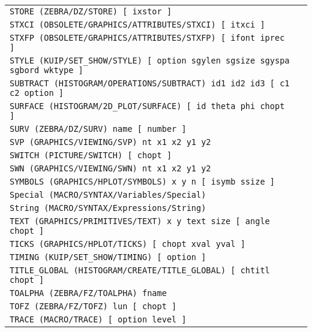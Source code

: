\begin{longtable}{|>{\footnotesize\tt}lr|}
STORE (ZEBRA/DZ/STORE)  [ ixstor ] & \pageref{ref:ZEBRA/DZ/STORE}\\ 
STXCI (OBSOLETE/GRAPHICS/ATTRIBUTES/STXCI)  [ itxci ] & \pageref{ref:OBSOLETE/GRAPHICS/ATTRIBUTES/STXCI}\\ 
STXFP (OBSOLETE/GRAPHICS/ATTRIBUTES/STXFP)  [ ifont iprec ] & \pageref{ref:OBSOLETE/GRAPHICS/ATTRIBUTES/STXFP}\\ 
STYLE (KUIP/SET_SHOW/STYLE)  [ option sgylen sgsize sgyspa sgbord wktype ] & \pageref{ref:KUIP/SET_SHOW/STYLE}\\ 
SUBTRACT (HISTOGRAM/OPERATIONS/SUBTRACT)  id1 id2 id3 [ c1 c2 option ] & \pageref{ref:HISTOGRAM/OPERATIONS/SUBTRACT}\\ 
SURFACE (HISTOGRAM/2D_PLOT/SURFACE)  [ id theta phi chopt ] & \pageref{ref:HISTOGRAM/2D_PLOT/SURFACE}\\ 
SURV (ZEBRA/DZ/SURV)  name [ number ] & \pageref{ref:ZEBRA/DZ/SURV}\\ 
SVP (GRAPHICS/VIEWING/SVP)  nt x1 x2 y1 y2 & \pageref{ref:GRAPHICS/VIEWING/SVP}\\ 
SWITCH (PICTURE/SWITCH)  [ chopt ] & \pageref{ref:PICTURE/SWITCH}\\ 
SWN (GRAPHICS/VIEWING/SWN)  nt x1 x2 y1 y2 & \pageref{ref:GRAPHICS/VIEWING/SWN}\\ 
SYMBOLS (GRAPHICS/HPLOT/SYMBOLS)  x y n [ isymb ssize ] & \pageref{ref:GRAPHICS/HPLOT/SYMBOLS}\\ 
Special (MACRO/SYNTAX/Variables/Special)  & \pageref{ref:MACRO/SYNTAX/Variables/Special}\\ 
String (MACRO/SYNTAX/Expressions/String)  & \pageref{ref:MACRO/SYNTAX/Expressions/String}\\ 
TEXT (GRAPHICS/PRIMITIVES/TEXT)  x y text size [ angle chopt ] & \pageref{ref:GRAPHICS/PRIMITIVES/TEXT}\\ 
TICKS (GRAPHICS/HPLOT/TICKS)  [ chopt xval yval ] & \pageref{ref:GRAPHICS/HPLOT/TICKS}\\ 
TIMING (KUIP/SET_SHOW/TIMING)  [ option ] & \pageref{ref:KUIP/SET_SHOW/TIMING}\\ 
TITLE_GLOBAL (HISTOGRAM/CREATE/TITLE_GLOBAL)  [ chtitl chopt ] & \pageref{ref:HISTOGRAM/CREATE/TITLE_GLOBAL}\\ 
TOALPHA (ZEBRA/FZ/TOALPHA)  fname & \pageref{ref:ZEBRA/FZ/TOALPHA}\\ 
TOFZ (ZEBRA/FZ/TOFZ)  lun [ chopt ] & \pageref{ref:ZEBRA/FZ/TOFZ}\\ 
TRACE (MACRO/TRACE)  [ option level ] & \pageref{ref:MACRO/TRACE}\\ 

\end{longtable}
